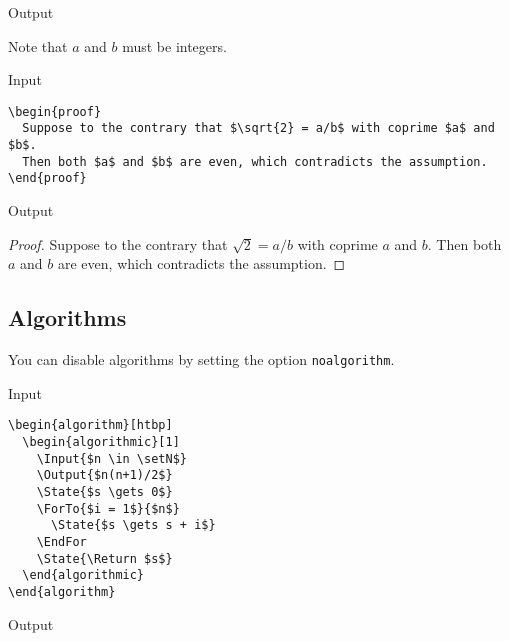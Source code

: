 \documentclass[a4paper, 11pt]{article}
\begin{document}
\begin{itembox}[l]{Output}
  \begin{remark}
    Note that $a$ and $b$ must be integers.
  \end{remark}
\end{itembox}

\begin{itembox}[l]{Input}
\begin{verbatim}
\begin{proof}
  Suppose to the contrary that $\sqrt{2} = a/b$ with coprime $a$ and $b$.
  Then both $a$ and $b$ are even, which contradicts the assumption.
\end{proof}
\end{verbatim}
\end{itembox}

\begin{itembox}[l]{Output}
  \begin{proof}
    Suppose to the contrary that $\sqrt{2} = a/b$ with coprime $a$ and $b$.
    Then both $a$ and $b$ are even, which contradicts the assumption.
  \end{proof}
\end{itembox}

\subsection{Algorithms}

You can disable algorithms by setting the option \texttt{noalgorithm}.

\begin{itembox}[l]{Input}
\begin{verbatim}
\begin{algorithm}[htbp]
  \begin{algorithmic}[1]
    \Input{$n \in \setN$}
    \Output{$n(n+1)/2$}
    \State{$s \gets 0$}
    \ForTo{$i = 1$}{$n$}
      \State{$s \gets s + i$}
    \EndFor
    \State{\Return $s$}
  \end{algorithmic}
\end{algorithm}
\end{verbatim}
\end{itembox}

\begin{itembox}[l]{Output}
  \begin{algorithmic}[1]
    \EndFor{}
  \end{algorithmic}
\end{itembox}
\end{document}

